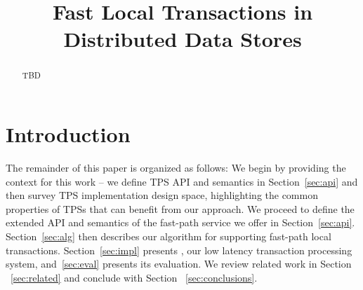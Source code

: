 \documentclass[preprint,10pt]{sigplanconf}
\begin{document}
\title{Fast Local Transactions in Distributed Data Stores}


\maketitle

\sloppy


\begin{abstract}
TBD
\end{abstract}


\section{Introduction} \label{sec:intro}


The remainder of this paper is organized as follows:
We begin by providing the context for this work -- we define TPS API and semantics in Section~\ref{sec:api} and
then  survey TPS implementation design space, highlighting the common properties of TPSs that can benefit from our approach. 
We proceed to define the extended API and semantics of the fast-path service we offer in Section~\ref{sec:api}.
Section~\ref{sec:alg} then describes our algorithm for supporting fast-path local transactions.  
Section~\ref{sec:impl} presents \sys, our low latency transaction processing system,
and~\ref{sec:eval} presents its evaluation. 
We review related work in Section ~\ref{sec:related} and conclude with Section ~\ref{sec:conclusions}.
\end{document}
